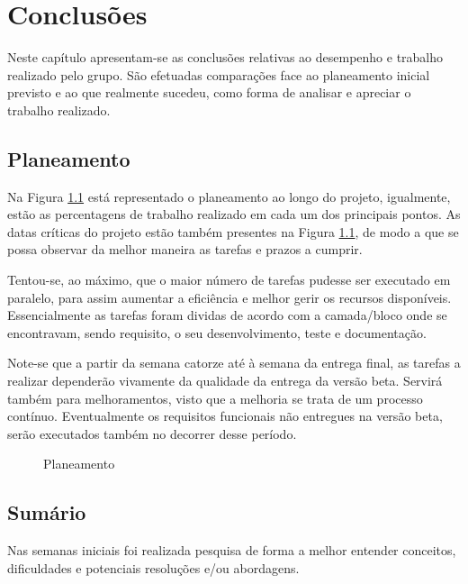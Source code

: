 %
%
\chapter{Conclusões} \label{cap5}

Neste capítulo apresentam-se as conclusões relativas ao desempenho e trabalho realizado pelo grupo. São efetuadas comparações face ao planeamento inicial previsto e ao que realmente sucedeu, como forma de analisar e apreciar o trabalho realizado.

\section{Planeamento}\label{sec51}

Na Figura \ref{planning} está representado o planeamento ao longo do projeto, igualmente, estão as percentagens de trabalho realizado em cada um dos principais pontos. As datas críticas do projeto estão também presentes na Figura \ref{planning}, de modo a que se possa observar da melhor maneira as tarefas e prazos a cumprir.

Tentou-se, ao máximo, que o maior número de tarefas pudesse ser executado em paralelo, para assim aumentar a eficiência e melhor gerir os recursos disponíveis. Essencialmente as tarefas foram dividas de acordo com a camada/bloco onde se encontravam, sendo requisito, o seu desenvolvimento, teste e documentação.


Note-se que a partir da semana catorze até à semana da entrega final, as tarefas a realizar dependerão vivamente da qualidade da entrega da versão beta. Servirá também para melhoramentos, visto que a melhoria se trata de um processo contínuo. Eventualmente os requisitos funcionais não entregues na versão beta, serão executados também no decorrer desse período.
 

\begin{figure}
	\hspace{-1.75cm}
	\caption{Planeamento}
	\label{planning}
\end{figure}

\section{Sumário}\label{sec52}

Nas semanas iniciais foi realizada pesquisa de forma a melhor entender conceitos, dificuldades e potenciais resoluções e/ou abordagens. 

